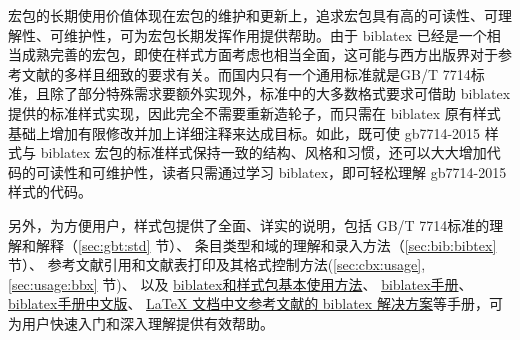 \documentclass[11pt]{article} %
\begin{document}
\begin{enumerate}
宏包的长期使用价值体现在宏包的维护和更新上，追求宏包具有高的可读性、可理解性、可维护性，可为宏包长期发挥作用提供帮助。由于 biblatex 已经是一个相当成熟完善的宏包，即使在样式方面考虑也相当全面，这可能与西方出版界对于参考文献的多样且细致的要求有关。而国内只有一个通用标准就是GB/T 7714标准，且除了部分特殊需求要额外实现外，标准中的大多数格式要求可借助 biblatex 提供的标准样式实现，因此完全不需要重新造轮子，而只需在 biblatex 原有样式基础上增加有限修改并加上详细注释来达成目标。如此，既可使 gb7714-2015 样式与 biblatex 宏包的标准样式保持一致的结构、风格和习惯，还可以大大增加代码的可读性和可维护性，读者只需通过学习 biblatex，即可轻松理解 gb7714-2015 样式的代码。


另外，为方便用户，样式包提供了全面、详实的说明，包括
GB/T 7714标准的理解和解释（\ref{sec:gbt:std} 节）、
条目类型和域的理解和录入方法（\ref{sec:bib:bibtex} 节）、
参考文献引用和文献表打印及其格式控制方法(\ref{sec:cbx:usage},\ref{sec:usage:bbx} 节)、
\hypertarget{lab:manual:hyper}{以及}
\href{https://github.com/hushidong/biblatex-gb7714-2015/wiki}{biblatex和样式包基本使用方法}、
\href{https://github.com/plk/biblatex}{biblatex手册}、
\href{https://github.com/hushidong/biblatex-zh-cn}{biblatex手册中文版}、
\href{https://github.com/hushidong/biblatex-solution-to-latex-bibliography}{LaTeX 文档中文参考文献的 biblatex 解决方案}等手册，可为用户快速入门和深入理解提供有效帮助。

\end{enumerate}

\end{document}
